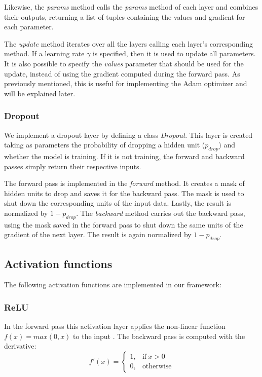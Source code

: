 \documentclass[10pt,conference,compsocconf]{IEEEtran}
\begin{document}
        Likewise, the \textit{params} method calls the \textit{params} method of each layer and combines their outputs, returning a list of tuples containing the values and gradient for each parameter.
        
        The \textit{update} method iterates over all the layers calling each layer's corresponding method. If a learning rate $\gamma$ is specified, then it is used to update all parameters. It is also possible to specify the \textit{values} parameter that should be used for the update, instead of using the gradient computed during the forward pass. As previously mentioned, this is useful for implementing the Adam optimizer and will be explained later.

  	\subsubsection{Dropout} %
  	\label{ssub:dropout}
        We implement a dropout layer by defining a class \textit{Dropout}. This layer is created taking as parameters the probability of dropping a hidden unit ($p_{drop}$) and whether the model is training. If it is not training, the forward and backward passes simply return their respective inputs.
        
        The forward pass is implemented in the \textit{forward} method. It creates a mask of hidden units to drop and saves it for the backward pass. The mask is used to shut down the corresponding units of the input data. Lastly, the result is normalized by $1-p_{drop}$. The \textit{backward} method carries out the backward pass, using the mask saved in the forward pass to shut down the same units of the gradient of the next layer. The result is again normalized by $1-p_{drop}$.

  \subsection{Activation functions} %
  \label{sub:activation_functions}
    The following activation functions are implemented in our framework:
  	\subsubsection{ReLU} %
  	\label{ssub:relu}
        In the forward pass this activation layer applies the non-linear function $f(x) = max(0,x)$ to the input \cite{Nair:2010:RLU:3104322.3104425}. The backward pass is computed with the derivative:
      	\begin{equation*} 
            f'(x)=
            \begin{cases}
              1, & \text{if}\ x>0 \\
              0, & \text{otherwise}
            \end{cases}
        \end{equation*}
\end{document}

